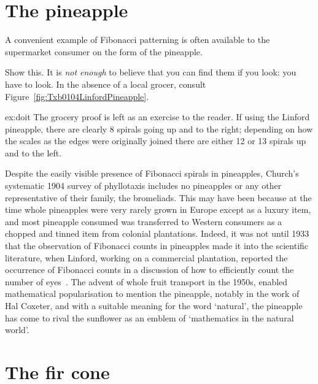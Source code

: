  \section{The pineapple}
A convenient example of Fibonacci patterning is often available to the supermarket consumer on the form of the pineapple.
\begin{jExercise}
	\label{ex:doit}
	Show this.  It is \emph{not enough} to believe that you can find them if you look: you have to look. In the absence of a local grocer, consult Figure~\ref{fig:Txb0104LinfordPineapple}.
\end{jExercise}
\begin{jAnswer}{ex:doit}{
	The grocery proof is left as an exercise to the reader. If using the Linford pineapple, there are clearly 8 spirals going up and to the right; depending on how the scales as the edges were originally joined there are either 12 or 13 spirals up and to the left. 
}\end{jAnswer} 
Despite the easily visible presence of Fibonacci spirals in pineapples, Church's systematic 1904 survey of phyllotaxis includes no pineapples or any other representative of their family, the bromeliads. This may have been because at the time whole pineapples were very rarely grown in Europe except as a luxury item, and most pineapple consumed was transferred to Western consumers as a chopped and tinned item from colonial plantations. Indeed, it was not until 1933 that the observation of Fibonacci counts in pineapples made it into the scientific literature, when Linford, working on a commercial plantation, reported the occurrence of Fibonacci counts in a discussion of how to efficiently count the number of eyes~\cite{linfordFruitQualityStudies1933}. The advent of whole fruit transport in the 1950s, enabled  mathematical popularisation to mention the pineapple, notably in the work of Hal Coxeter, and with a suitable meaning for the word `natural',  the pineapple has come to rival the sunflower as an emblem of `mathematics in the natural world'.

 
\section{The fir cone}

